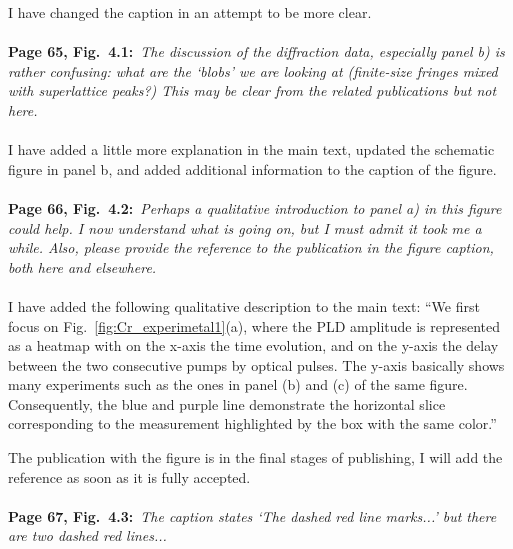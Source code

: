 \documentclass[a4, UTF8]{article}
\begin{document}
I have changed the caption in an attempt to be more clear.
\\\\
{\bf Page 65, Fig.~4.1:}~{\it The discussion of the diffraction data, especially panel b) is rather confusing:
what are the ‘blobs’ we are looking at (finite-size fringes mixed with superlattice peaks?) This may
be clear from the related publications but not here.}
\\\\
I have added a little more explanation in the main text, updated the schematic figure in panel b, and added additional information to the caption of the figure.
\\\\
{\bf Page 66, Fig.~4.2:}~{\it Perhaps a qualitative introduction to panel a) in this figure could help. I now understand what is going on, but I must admit it took me a while. Also, please provide the
reference to the publication in the figure caption, both here and elsewhere.}
\\\\
I have added the following qualitative description to the main text:
``We first focus on Fig.~\ref{fig:Cr_experimetal1}(a), where the PLD amplitude is represented as a heatmap with on the x-axis the time evolution, and on the y-axis the delay between the two consecutive pumps by optical pulses. The y-axis basically shows many experiments such as the ones in panel (b) and (c) of the same figure. Consequently, the blue and purple line demonstrate the horizontal slice corresponding to the measurement highlighted by the box with the same color.''

The publication with the figure is in the final stages of publishing, I will add the reference as soon as it is fully accepted.
\\\\
{\bf Page 67, Fig.~4.3:}~{\it The caption states `The dashed red line marks...’ but there are two dashed red lines...}
\end{document}
